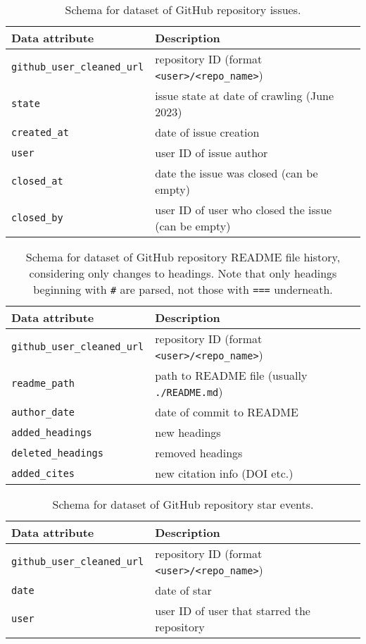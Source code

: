 \documentclass[10pt,a4paper]{scrartcl}
\begin{document}
\begin{table}
    \centering
    \begin{tabular}{l|l}
        \hline
        Data attribute & Description \\
        \hline
        \verb|github_user_cleaned_url| & repository ID (format \verb|<user>/<repo_name>|) \\
        \verb|state| & issue state at date of crawling (June 2023) \\
        \verb|created_at| & date of issue creation \\
        \verb|user| & user ID of issue author \\
        \verb|closed_at| & date the issue was closed (can be empty) \\
        \verb|closed_by| & user ID of user who closed the issue (can be empty) \\
        \hline
    \end{tabular}
    \caption{Schema for dataset of GitHub repository issues.}
    \label{table:issues}
\end{table}

\begin{table}
    \centering
    \begin{tabular}{l|l}
        \hline
        Data attribute & Description \\
        \hline
        \verb|github_user_cleaned_url| & repository ID (format \verb|<user>/<repo_name>|) \\
        \verb|readme_path| & path to README file (usually \verb|./README.md|) \\
        \verb|author_date| & date of commit to README \\
        \verb|added_headings| & new headings \\
        \verb|deleted_headings| & removed headings \\
        \verb|added_cites| & new citation info (DOI etc.) \\
        \hline
    \end{tabular}
    \caption{Schema for dataset of GitHub repository README file history, considering only changes to headings. Note that only headings beginning with \texttt{\#} are parsed, not those with \texttt{===} underneath.}
    \label{table:readme_headings}
\end{table}

\begin{table}
    \centering
    \begin{tabular}{l|l}
        \hline
        Data attribute & Description \\
        \hline
        \verb|github_user_cleaned_url| & repository ID (format \verb|<user>/<repo_name>|) \\
        \verb|date| & date of star \\
        \verb|user| & user ID of user that starred the repository \\
        \hline
    \end{tabular}
    \caption{Schema for dataset of GitHub repository star events.}
    \label{table:stars}
\end{table}
\end{document}

